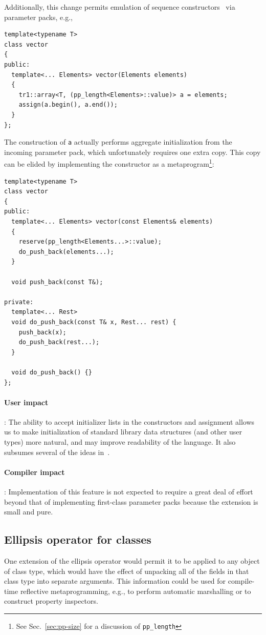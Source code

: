\documentclass{article}
\begin{document}
Additionally, this change permits emulation of sequence
constructors~\cite{DoReStr03} via parameter packs, e.g.,
\begin{verbatim}
template<typename T>
class vector
{
public:
  template<... Elements> vector(Elements elements)
  {
    tr1::array<T, (pp_length<Elements>::value)> a = elements;
    assign(a.begin(), a.end());
  }
};
\end{verbatim}

The construction of \texttt{a} actually performs aggregate
initialization from the incoming parameter pack, which unfortunately
requires one extra copy. This copy can be elided by implementing the
constructor as a metaprogram\footnote{See Sec.~\ref{sec:pp-size} for a
  discussion of \texttt{pp\_length}}:

\begin{verbatim}
template<typename T>
class vector
{
public:
  template<... Elements> vector(const Elements& elements)
  {
    reserve(pp_length<Elements...>::value);
    do_push_back(elements...);
  }

  void push_back(const T&);

private:
  template<... Rest>
  void do_push_back(const T& x, Rest... rest) {
    push_back(x);
    do_push_back(rest...);
  }

  void do_push_back() {}
};
\end{verbatim}

\paragraph{User impact}: The ability to accept initializer lists in
the constructors and assignment allows us to make initialization of
standard library data structures (and other user types) more natural,
and may improve readability of the language. It also subsumes several
of the ideas in~\cite{DoReStr03}.

\paragraph{Compiler impact}: Implementation of this feature is not
expected to require a great deal of effort beyond that of implementing
first-class parameter packs because the extension is small and pure.

\subsection{Ellipsis operator for classes}
One extension of the ellipsis operator would permit it to be applied
to any object of class type, which would have the effect of unpacking
all of the fields in that class type into separate arguments. This
information could be used for compile-time reflective metaprogramming,
e.g., to perform automatic marshalling or to construct property
inspectors. 
\end{document}
